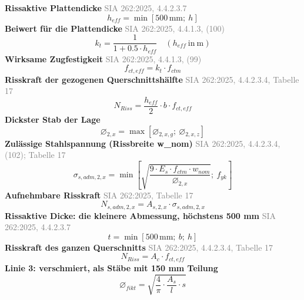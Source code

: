\documentclass[11pt,a4paper]{article}
\newcommand{\normref}[1]{{\small\textcolor{gray}{#1}}}
\begin{document}
\noindent\textbf{Rissaktive Plattendicke} \hfill \normref{SIA 262:2025, 4.4.2.3.7}
\begin{equation*}
h_{eff} = \min\left[500\,\mathrm{mm};\ h\right]
\end{equation*}
\noindent\textbf{Beiwert für die Plattendicke} \hfill \normref{SIA 262:2025, 4.4.1.3, (100)}
\begin{equation*}
k_t = \frac{1}{1 + 0.5 \cdot h_{eff}} \quad \left(h_{eff}\ \text{in}\ \mathrm{m}\right)
\end{equation*}
\noindent\textbf{Wirksame Zugfestigkeit} \hfill \normref{SIA 262:2025, 4.4.1.3, (99)}
\begin{equation*}
f_{ct,eff} = k_t \cdot f_{ctm}
\end{equation*}
\noindent\textbf{Risskraft der gezogenen Querschnittshälfte} \hfill \normref{SIA 262:2025, 4.4.2.3.4, Tabelle 17}
\begin{equation*}
N_{Riss} = \frac{h_{eff}}{2} \cdot b \cdot f_{ct,eff}
\end{equation*}
\noindent\textbf{Dickster Stab der Lage}
\begin{equation*}
\varnothing_{2,x} = \max\left[\varnothing_{2,x,g};\ \varnothing_{2,x,z}\right]
\end{equation*}
\noindent\textbf{Zulässige Stahlspannung (Rissbreite w\_nom)} \hfill \normref{SIA 262:2025, 4.4.2.3.4, (102); Tabelle 17}
\begin{equation*}
\sigma_{s,adm,2,x} = \min\left[\sqrt{\frac{9 \cdot E_s \cdot f_{ctm} \cdot w_{nom}}{\varnothing_{2,x}}};\ f_{yk}\right]
\end{equation*}
\noindent\textbf{Aufnehmbare Risskraft} \hfill \normref{SIA 262:2025, Tabelle 17}
\begin{equation*}
N_{s,adm,2,x} = A_{s,2,x} \cdot \sigma_{s,adm,2,x}
\end{equation*}
\noindent\textbf{Rissaktive Dicke: die kleinere Abmessung, höchstens 500 mm} \hfill \normref{SIA 262:2025, 4.4.2.3.7}
\begin{equation*}
t = \min\left[500\,\mathrm{mm};\ b;\ h\right]
\end{equation*}
\noindent\textbf{Risskraft des ganzen Querschnitts} \hfill \normref{SIA 262:2025, 4.4.2.3.4, Tabelle 17}
\begin{equation*}
N_{Riss} = A_c \cdot f_{ct,eff}
\end{equation*}
\noindent\textbf{Linie 3: verschmiert, als Stäbe mit 150 mm Teilung}
\begin{equation*}
\varnothing_{fikt} = \sqrt{\frac{4}{\pi} \cdot \frac{A_s}{l} \cdot s}
\end{equation*}
\end{document}
